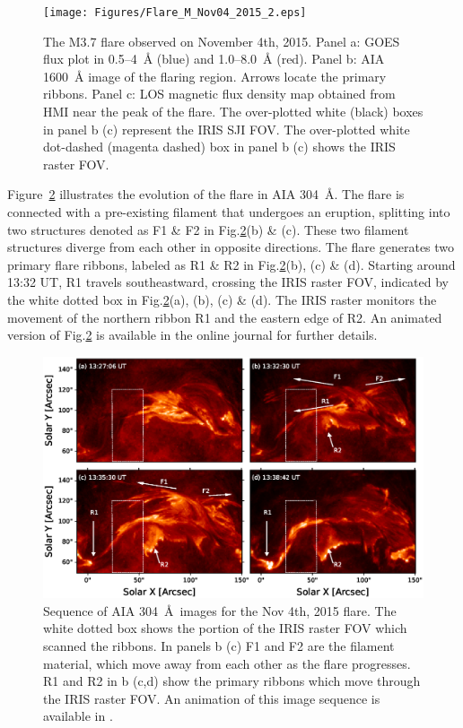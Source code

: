 \begin{figure}[ht!]
    \centering
\texttt{[image: Figures/Flare\_M\_Nov04\_2015\_2.eps]}
\caption{The M3.7 flare observed on November 4th, 2015. Panel a: GOES flux plot in 0.5{--}4~{\AA} (blue) and 1.0{--}8.0~{\AA} (red). Panel b: AIA 1600~{\AA} image of the flaring region. Arrows locate the primary ribbons. Panel c: LOS magnetic flux density map obtained from HMI near the peak of the flare. The over-plotted white (black) boxes in panel b (c) represent the IRIS SJI FOV. The over-plotted white dot-dashed (magenta dashed) box in panel b (c) shows the IRIS raster FOV.}\label{flare1}
\end{figure}

Figure~\ref{flare_m_ev} illustrates the evolution of the flare in AIA 304~{\AA}. The flare is connected with a pre-existing filament that undergoes an eruption, splitting into two structures denoted as F1 \& F2 in Fig.\ref{flare_m_ev}(b) \& (c). These two filament structures diverge from each other in opposite directions. The flare generates two primary flare ribbons, labeled as R1 \& R2 in Fig.\ref{flare_m_ev}(b), (c) \& (d). Starting around 13:32 UT, R1 travels southeastward, crossing the IRIS raster FOV, indicated by the white dotted box in Fig.\ref{flare_m_ev}(a), (b), (c) \& (d). The IRIS raster monitors the movement of the northern ribbon R1 and the eastern edge of R2. An animated version of Fig.\ref{flare_m_ev} is available in the online journal for further details.

\begin{figure}[ht!]
    \begin{center}
    \includegraphics[width=\textwidth]{Figures/nov_flare_304_aa_evolv.eps}
    \end{center}
    \caption{Sequence of AIA 304~{\AA}~images for the Nov 4th, 2015 flare. The white dotted box shows the portion of the IRIS raster FOV which scanned the ribbons. In panels b (c) F1 and F2 are the filament material, which move away from each other as the flare progresses. R1 and R2 in b (c,d) show the primary ribbons which move through the IRIS raster FOV. An animation of this image sequence is available in \cite{roy24}.}
    \label{flare_m_ev}
\end{figure}

